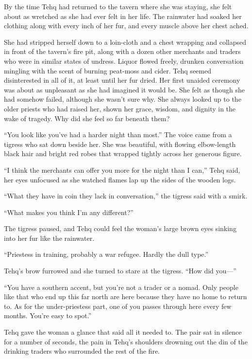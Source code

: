 \noindent By the time Tehq had returned to the tavern where she was staying, she felt about as wretched as she had ever felt in her life. The rainwater had soaked her clothing along with every inch of her fur, and every muscle above her chest ached.

She had stripped herself down to a loin-cloth and a chest wrapping and collapsed in front of the tavern's fire pit, along with a dozen other merchants and traders who were in similar states of undress. Liquor flowed freely, drunken conversation mingling with the scent of burning peat-moss and cider. Tehq seemed disinterested in all of it, at least until her fur dried. Her first unaided ceremony was about as unpleasant as she had imagined it would be. She felt as though she had somehow failed, although she wasn't sure why. She always looked up to the older priests who had raised her, shown her grace, wisdom, and dignity in the wake of tragedy. Why did she feel so far beneath them?

``You look like you've had a harder night than most.'' The voice came from a tigress who sat down beside her. She was beautiful, with flowing elbow-length black hair and bright red robes that wrapped tightly across her generous figure.

``I think the merchants can offer you more for the night than I can,'' Tehq said, her eyes unfocused as she watched flames lap up the sides of the wooden logs.

``What they have in coin they lack in conversation,'' the tigress said with a smirk.

``What makes you think I'm any different?''

The tigress paused, and Tehq could feel the woman's large brown eyes sinking into her fur like the rainwater.

``Priestess in training, probably a war refugee. Hardly the dull type.''

Tehq's brow furrowed and she turned to stare at the tigress. ``How did you---''

``You have a southern accent, but you're not a trader or a nomad. Only people like that who end up this far north are here because they have no home to return to. As for the under-priestess part, one of you passes through here every few months. You're easy to spot.''

Tehq gave the woman a glance that said all it needed to. The pair sat in silence for a number of seconds, the pain in Tehq's shoulders drowning out the din of the drinking traders who surrounded the rest of the fire.

